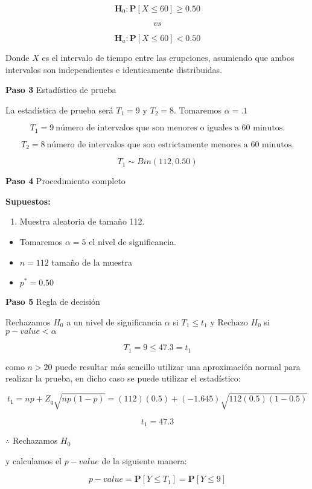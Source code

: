 \documentclass[
  a4paper,
  oneside,
  openany]{book}
\providecommand{\tightlist}{%
  \setlength{\itemsep}{0pt}\setlength{\parskip}{0pt}}
\begin{document}
\[\textbf{H}_0: \mathbf{P}[X \leq 60]\geq 0.50\]

\[vs\]

\[\textbf{H}_a:  \mathbf{P}[X \leq 60]<0.50\]

Donde \(X\) es el intervalo de tiempo entre las erupciones, asumiendo que ambos intervalos son independientes e identicamente distribuidas.

\textbf{Paso 3} Estadístico de prueba

La estadística de prueba será \(T_1=9\) y \(T_2=8\). Tomaremos \(\alpha=.1\)

\[T_{1}=9 \ \mbox{número  de  intervalos que  son menores o iguales  a 60 minutos.}\]

\[T_{2}=8 \ \mbox{número  de  intervalos que  son estrictamente menores a 60 minutos.}\]

\[T_{1}\sim Bin(112,0.50)\]

\textbf{Paso 4} Procedimiento completo

\textbf{Supuestos:}

\begin{enumerate}
\def\labelenumi{\arabic{enumi}.}
\tightlist
\item
  Muestra aleatoria de tamaño 112.
\end{enumerate}

\begin{itemize}
\item
  Tomaremos \(\alpha = 5%
  \) el nivel de significancia.
\item
  \(n = 112\) tamaño de la muestra
\item
  \(p^* = 0.50\)
\end{itemize}

\textbf{Paso 5} Regla de decisión

Rechazamos \(H_0\) a un nivel de significancia \(\alpha\) si \(T_{1} \leq t_{1}\) y Rechazo \(H_0\) si \(p-value<\alpha\)

\[T_{1}=9 \leq 47.3=t_{1}\]

como \(n>20\) puede resultar más sencillo utilizar una aproximación normal para realizar la prueba, en dicho caso se puede utilizar el estadístico:

\[t_{1}=np+Z_{q}\sqrt{np(1-p)}=(112)(0.5)+(-1.645)\sqrt{112(0.5)(1-0.5)}\]

\[t_{1}=47.3\]

\(\therefore\) Rechazamos \(H_0\)

y calculamos el \(p-value\) de la siguiente manera:

\[p-value= \mathbf{P}[Y\leq T_{1}]=\mathbf{P}[Y\leq 9]\]
\end{document}
